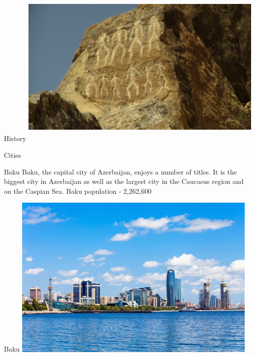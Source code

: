 \documentclass[hyperref={pdfpagemode=FullScreen}]{beamer}
\begin{document}
\begin{frame}{History}
\includegraphics[width=12cm, height=8cm]{img/aze02.jpg}
\end{frame}

\begin{frame}{Cities}
\begin{alertblock}{Baku}
\justifying Baku, the capital city of Azerbaijan, enjoys a number of titles. It is the biggest city in Azerbaijan as well as the largest city in the Caucasus region and on the Caspian Sea. Baku population - 2,262,600
\end{alertblock}
\end{frame}

\begin{frame}{Baku}
\includegraphics[width=12cm, height=8cm]{img/baku01.jpg}
\end{frame}
\end{document}
